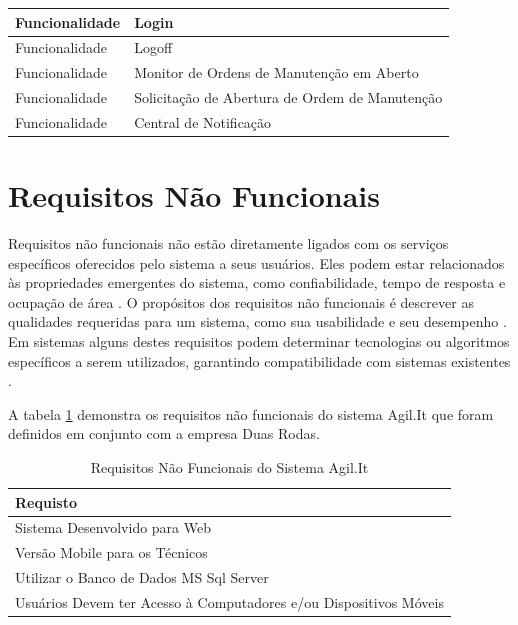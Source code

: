 \begin{table}[H]
\begin{tabular}{l|l}
		Funcionalidade             & Login                                          \\ \hline
		Funcionalidade             & Logoff                                         \\ \hline
		Funcionalidade             & Monitor de Ordens de Manutenção em Aberto      \\ \hline
		Funcionalidade             & Solicitação de Abertura de Ordem de Manutenção \\ \hline
		Funcionalidade             & Central de Notificação                         \\ \hline
	\end{tabular}
\end{table}

\section{Requisitos Não Funcionais}

Requisitos não funcionais não estão diretamente ligados com os serviços específicos oferecidos pelo sistema a seus usuários. Eles podem estar relacionados às propriedades emergentes do sistema, como confiabilidade, tempo de resposta e ocupação de área \cite{sommerville2011software}. O propósitos dos requisitos não funcionais é descrever as qualidades requeridas para um sistema, como sua usabilidade e seu desempenho \cite{IIBA2005}. Em sistemas alguns destes requisitos podem determinar tecnologias ou algoritmos específicos a serem utilizados, garantindo compatibilidade com sistemas existentes \cite{cordeiro2007}.

A tabela \ref{tabela-requsitos-nao-funcionais} demonstra os requisitos não funcionais do sistema Agil.It que foram definidos em conjunto com a empresa Duas Rodas.

\begin{table}[H]
	\centering
	\caption{\label{tabela-requsitos-nao-funcionais}Requisitos Não Funcionais do Sistema Agil.It}
	\begin{tabular}{l}
		\hline
		\multicolumn{1}{l}{\textbf{Requisto}}                                                 \\ \hline
		\multicolumn{1}{l}{Sistema Desenvolvido para Web}                                     \\ \hline
		\multicolumn{1}{l}{Versão Mobile para os Técnicos}                                    \\ \hline
		\multicolumn{1}{l}{Utilizar o Banco de Dados MS Sql Server}                           \\ \hline
		\multicolumn{1}{l}{Usuários Devem ter Acesso à Computadores e/ou Dispositivos Móveis} \\ \hline
	\end{tabular}
\end{table}

